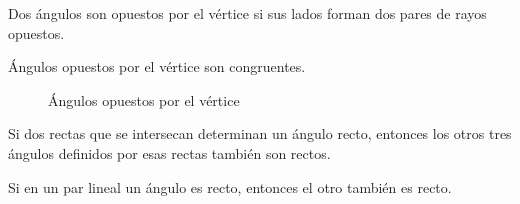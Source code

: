 \begin{definition}
    Dos ángulos son opuestos por el vértice si sus lados forman dos pares de rayos opuestos.
\end{definition}

\begin{theorem}
    Ángulos opuestos por el vértice son congruentes.

    \begin{figure}[!h]
        \centering
        
        \caption{Ángulos opuestos por el vértice}
        \label{fig:vertex-angle}
    \end{figure}
    
\end{theorem}

\begin{theorem}
    Si dos rectas que se intersecan determinan un ángulo recto, entonces los otros tres ángulos definidos por esas rectas también son rectos.
\end{theorem}

\begin{theorem}
    Si en un par lineal un ángulo es recto, entonces el otro también es recto.
\end{theorem}
